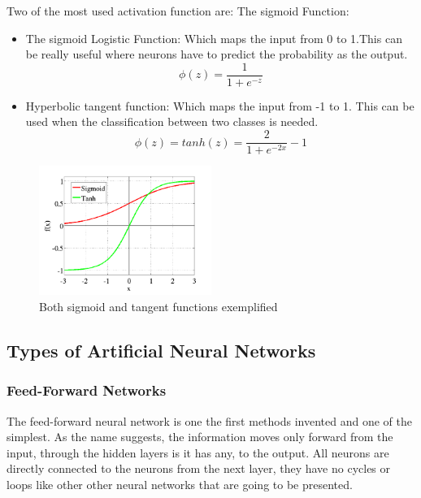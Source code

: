 Two of the most used activation function are:
The sigmoid Function:

\begin{itemize}
\item The sigmoid Logistic Function: Which maps the input from 0 to 1.This can be really useful where neurons have to predict the probability as the output.
\begin{equation}
 \phi(z) = \frac{1}{1+e^{-z}}
\end{equation}

\item Hyperbolic tangent function: Which maps the input from -1 to 1. This can be used when the classification between two classes is needed.
\begin{equation}
 \phi(z) = tanh(z)= \frac{2}{1+e^{-2x}}-1
\end{equation}

\end{itemize}

\begin{figure}[htp]
	\centering
	\includegraphics[width=0.5\textwidth]{Illustrations/sigmoidandtangent.jpeg}
	\caption{Both sigmoid and tangent functions exemplified}
	\label{fig:SigmoidAndTangent}
\end{figure}

\subsection{Types of Artificial Neural Networks}

\subsubsection{Feed-Forward Networks}

The feed-forward neural network is one the first methods invented and one of the simplest. As the name suggests, the information moves only forward from the input, through the hidden layers is it has any, to the output. All neurons are directly connected to the neurons from the next layer, they have no cycles or loops like other other neural networks that are going to be presented.

